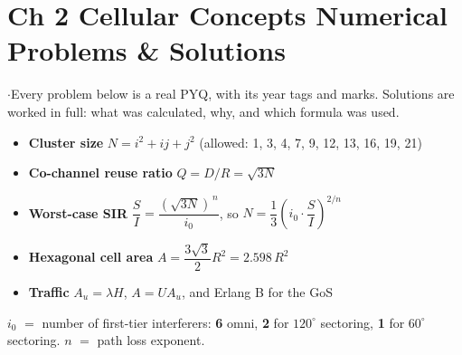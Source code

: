 \section*{\color{acc}Ch 2 \textperiodcentered{} Cellular Concepts \gap
\textcolor{sub}{Numerical Problems \& Solutions}}
\vspace{-4pt}{\color{acc}\rule{\textwidth}{1.1pt}}\vspace{4pt}

{\color{sub}\footnotesize {} \gap$\cdot$\gap Every problem below is a real PYQ, with its year tags and marks.
Solutions are worked in full: what was calculated, why, and which formula was used.
}

\begin{itemize}
  \item \textbf{Cluster size} \; $N = i^2 + ij + j^2$ \; (allowed: 1, 3, 4, 7, 9, 12, 13, 16, 19, 21)
  \item \textbf{Co-channel reuse ratio} \; $Q = D/R = \sqrt{3N}$
  \item \textbf{Worst-case SIR} \; $\dfrac{S}{I} = \dfrac{(\sqrt{3N})^{\,n}}{i_0}$, \;
        so \; $N = \dfrac{1}{3}\left(i_0 \cdot \dfrac{S}{I}\right)^{2/n}$
  \item \textbf{Hexagonal cell area} \; $A = \dfrac{3\sqrt{3}}{2}R^2 = 2.598\,R^2$
  \item \textbf{Traffic} \; $A_u = \lambda H$, \; $A = U A_u$, \; and Erlang B for the GoS
\end{itemize}
{\color{sub}\footnotesize $i_0$ $=$ number of first-tier interferers:
\textbf{6} omni, \textbf{2} for $120^\circ$ sectoring, \textbf{1} for $60^\circ$ sectoring.
$n$ $=$ path loss exponent.}

\hr

{\color{sub}\footnotesize {} }

